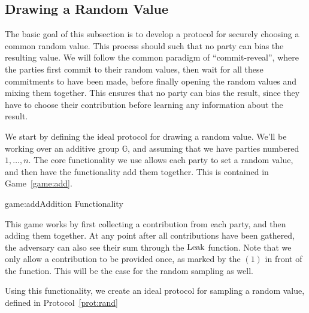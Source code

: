 \subsection{Drawing a Random Value}

The basic goal of this subsection is to develop a protocol for securely
choosing a common random value.
This process should such that no party can bias the resulting value.
We will follow the common paradigm of ``commit-reveal'', where the parties
first commit to their random values, then wait for all these commitments to have been made,
before finally opening the random values and mixing them together.
This ensures that no party can bias the result, since they have to choose
their contribution before learning any information about the result.

We start by defining the ideal protocol for drawing a random value.
We'll be working over an additive group $\mathbb{G}$,
and assuming that we have parties numbered $1, \ldots, n$.
The core functionality we use allows each party to set a random value,
and then have the functionality add them together.
This is contained in Game~\ref{game:add}.

\begin{game}{game:add}{Addition Functionality}
\end{game}

This game works by first collecting a contribution from each party,
and then adding them together.
At any point after all contributions have been gathered,
the adversary can also see their sum through the $\text{Leak}$ function.
Note that we only allow a contribution to be provided once,
as marked by the $(1)$ in front of the function.
This will be the case for the random sampling as well.

Using this functionality, we create an ideal protocol for sampling
a random value, defined in Protocol~\ref{prot:rand}

